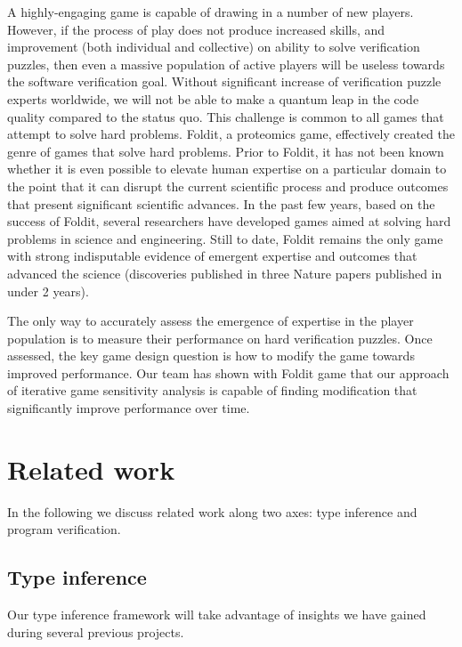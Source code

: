 \documentclass{sig-alternate}
\begin{document}
A highly-engaging game is capable of drawing in a number of new
players.  However, if the process of play does not produce increased
skills, and improvement (both individual and collective) on ability to
solve verification puzzles, then even a massive population of active
players will be useless towards the software verification goal.
Without significant increase of verification puzzle experts worldwide,
we will not be able to make a quantum leap in the code quality
compared to the status quo.  This challenge is common to all games
that attempt to solve hard problems.  Foldit, a proteomics game,
effectively created the genre of games that solve hard problems.
Prior to Foldit, it has not been known whether it is even possible to
elevate human expertise on a particular domain to the point that it
can disrupt the current scientific process and produce outcomes that
present significant scientific advances.  In the past few years, based
on the success of Foldit, several researchers have developed games
aimed at solving hard problems in science and engineering.  Still to
date, Foldit remains the only game with strong indisputable evidence
of emergent expertise and outcomes that advanced the science
(discoveries published in three Nature papers published in under 2
years).

The only way to accurately assess the emergence of expertise in the
player population is to measure their performance on hard verification
puzzles.  Once assessed, the key game design question is how to modify
the game towards improved performance.  Our team has shown with Foldit
game that our approach of iterative game sensitivity analysis is
capable of finding modification that significantly improve performance
over time.



\section{Related work}
\label{sec:related-work}

In the following we discuss related work along two axes: type
inference and program verification.

\subsection{Type inference}
\label{sec:type-inference-previous}

Our type inference framework will take advantage of insights we have gained
during several previous projects.
\end{document}
